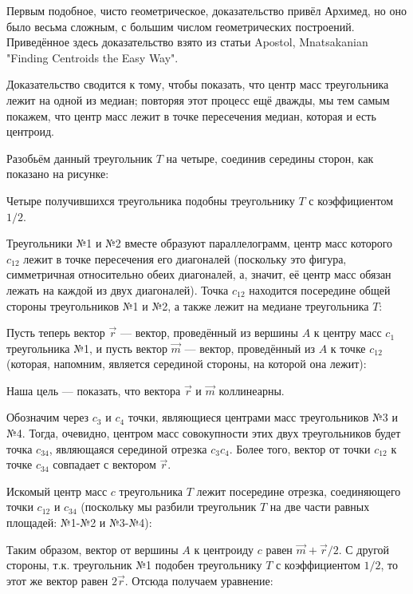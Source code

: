 Первым подобное, чисто геометрическое, доказательство привёл Архимед, но оно было весьма сложным, с большим числом геометрических построений. Приведённое здесь доказательство взято из статьи Apostol, Mnatsakanian "Finding Centroids the Easy Way".

Доказательство сводится к тому, чтобы показать, что центр масс треугольника лежит на одной из медиан; повторяя этот процесс ещё дважды, мы тем самым покажем, что центр масс лежит в точке пересечения медиан, которая и есть центроид.

Разобьём данный треугольник $T$ на четыре, соединив середины сторон, как показано на рисунке:


Четыре получившихся треугольника подобны треугольнику $T$ с коэффициентом $1/2$.

Треугольники №1 и №2 вместе образуют параллелограмм, центр масс которого $c_{12}$ лежит в точке пересечения его диагоналей (поскольку это фигура, симметричная относительно обеих диагоналей, а, значит, её центр масс обязан лежать на каждой из двух диагоналей). Точка $c_{12}$ находится посередине общей стороны треугольников №1 и №2, а также лежит на медиане треугольника $T$:


Пусть теперь вектор $\vec{r}$ --- вектор, проведённый из вершины $A$ к центру масс $c_1$ треугольника №1, и пусть вектор $\vec{m}$ --- вектор, проведённый из $A$ к точке $c_{12}$ (которая, напомним, является серединой стороны, на которой она лежит):


Наша цель --- показать, что вектора $\vec{r}$ и $\vec{m}$ коллинеарны.

Обозначим через $c_3$ и $c_4$ точки, являющиеся центрами масс треугольников №3 и №4. Тогда, очевидно, центром масс совокупности этих двух треугольников будет точка $c_{34}$, являющаяся серединой отрезка $c_3 c_4$. Более того, вектор от точки $c_{12}$ к точке $c_{34}$ совпадает с вектором $\vec{r}$.

Искомый центр масс $c$ треугольника $T$ лежит посередине отрезка, соединяющего точки $c_{12}$ и $c_{34}$ (поскольку мы разбили треугольник $T$ на две части равных площадей: №1-№2 и №3-№4):


Таким образом, вектор от вершины $A$ к центроиду $c$ равен $\vec{m} + \vec{r}/2$. С другой стороны, т.к. треугольник №1 подобен треугольнику $T$ с коэффициентом $1/2$, то этот же вектор равен $2 \vec{r}$. Отсюда получаем уравнение:

